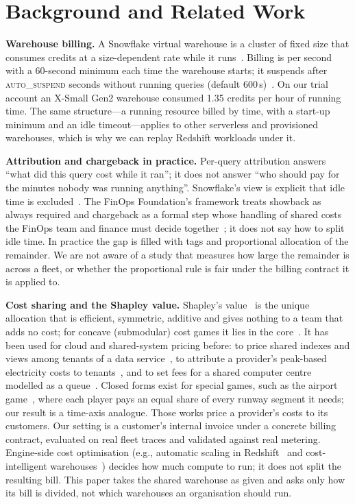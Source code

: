 \documentclass[sigconf]{acmart}
\newcommand{\autos}{\textsc{auto\_suspend}}
\begin{document}
\section{Background and Related Work}\label{sec:background}
\textbf{Warehouse billing.} A Snowflake virtual warehouse is a cluster of fixed size that consumes credits at a size-dependent
rate while it runs~\cite{snowflake16,sf-warehouses}. Billing is per second with a 60-second minimum each time the warehouse
starts; it suspends after \autos{} seconds without running queries (default 600\,s)~\cite{sf-create}. On our trial account
an X-Small Gen2 warehouse consumed 1.35 credits per hour of running time. The same structure---a running resource
billed by time, with a start-up minimum and an idle timeout---applies to other serverless and provisioned warehouses, which
is why we can replay Redshift workloads under it.

\textbf{Attribution and chargeback in practice.} Per-query attribution answers ``what did this query cost while it ran''; it
does not answer ``who should pay for the minutes nobody was running anything''. Snowflake's view is explicit that idle time
is excluded~\cite{sf-attribution}. The FinOps Foundation's framework treats showback as always required and chargeback
as a formal step whose handling of shared costs the FinOps team and finance must decide together~\cite{finops}; it does not
say how to split idle time. In practice the gap is filled with tags and proportional allocation of the remainder. We are not aware of a study that measures how large the remainder is
across a fleet, or whether the proportional rule is fair under the billing contract it is applied to.

\textbf{Cost sharing and the Shapley value.} Shapley's value~\cite{shapley53} is the unique allocation that is efficient,
symmetric, additive and gives nothing to a team that adds no cost; for concave (submodular) cost games it lies in the
core~\cite{shapley71}. It has been used for cloud and shared-system pricing before: to price shared indexes and views among
tenants of a data service~\cite{upadhyaya12}, to attribute a provider's peak-based electricity costs to
tenants~\cite{nasiriani16}, and to set fees for a shared computer centre modelled as a queue~\cite{mclean98}. Closed forms
exist for special games, such as the airport game~\cite{littlechild73}, where each player pays an equal share of every
runway segment it needs; our result is a time-axis analogue. Those works price a provider's costs to its customers. Our
setting is a customer's internal invoice under a concrete billing contract, evaluated on real fleet traces and validated
against real metering. Engine-side cost optimisation (e.g., automatic scaling in Redshift~\cite{rais24} and
cost-intelligent warehouses~\cite{costintel24}) decides how much compute to run; it does not split the resulting bill.
This paper takes the shared warehouse as given and asks only how its bill is divided, not which warehouses an organisation
should run.
\end{document}
